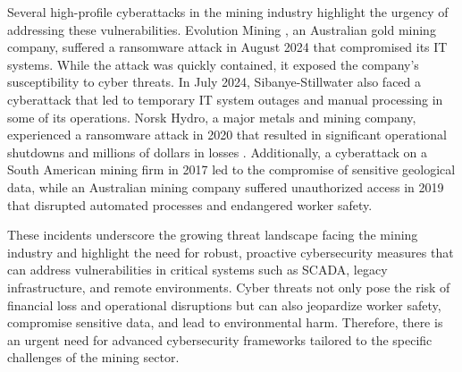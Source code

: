 \documentclass[a4paper,twoside,12pt]{report}
\begin{document}
Several high-profile cyberattacks in the mining industry highlight the urgency of addressing these vulnerabilities. Evolution Mining \citet{evolution2024}, an Australian gold mining company, suffered a ransomware attack in August 2024 that compromised its IT systems. While the attack was quickly contained, it exposed the company's susceptibility to cyber threats. In July 2024, Sibanye-Stillwater \citet{cameron2024sibanye} also faced a cyberattack that led to temporary IT system outages and manual processing in some of its operations. Norsk Hydro, a major metals and mining company, experienced a ransomware attack in 2020 that resulted in significant operational shutdowns and millions of dollars in losses \citet{ravichandran2024comprehensive}. Additionally, a cyberattack on a South American mining firm in 2017 led to the compromise of sensitive geological data, while an Australian mining company suffered unauthorized access in 2019 that disrupted automated processes and endangered worker safety.

These incidents underscore the growing threat landscape facing the mining industry and highlight the need for robust, proactive cybersecurity measures that can address vulnerabilities in critical systems such as SCADA, legacy infrastructure, and remote environments. Cyber threats not only pose the risk of financial loss and operational disruptions but can also jeopardize worker safety, compromise sensitive data, and lead to environmental harm. Therefore, there is an urgent need for advanced cybersecurity frameworks tailored to the specific challenges of the mining sector.
\end{document}
